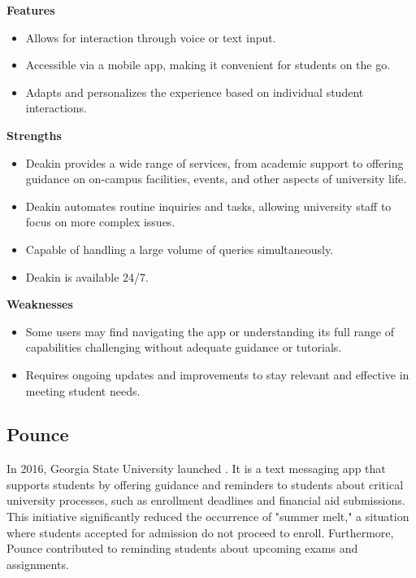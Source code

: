 \documentclass{l4proj}
\begin{document}
\textbf{Features}

\begin{itemize}

    \item  Allows for interaction through voice or text input.
    \item  Accessible via a mobile app, making it convenient for students on the go.
    \item Adapts and personalizes the experience based on individual student interactions.

\end{itemize}

\textbf{Strengths}

\begin{itemize}
    \item Deakin provides a wide range of services, from academic support to offering guidance on on-campus facilities, events, and other aspects of university life.
    
    \item Deakin automates routine inquiries and tasks, allowing university staff to focus on more complex issues.

    \item Capable of handling a large volume of queries simultaneously.
    
    \item Deakin is available 24/7.

\end{itemize}

\textbf{Weaknesses}

\begin{itemize}
    \item Some users may find navigating the app or understanding its full range of capabilities challenging without adequate guidance or tutorials.
    
    \item Requires ongoing updates and improvements to stay relevant and effective in meeting student needs.
\end{itemize}


\subsection{Pounce}

In 2016, Georgia State University launched \citep{pounce}. It is a text messaging app that supports students by offering guidance and reminders to students about critical university processes, such as enrollment deadlines and financial aid submissions. This initiative significantly reduced the occurrence of "summer melt," a situation where students accepted for admission do not proceed to enroll. Furthermore, Pounce contributed to reminding students about upcoming exams and assignments.
\end{document}
